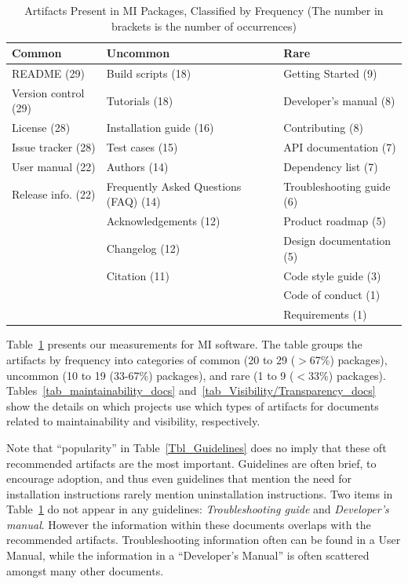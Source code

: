 \documentclass[final, 12pt, 3p, times]{elsarticle}
\begin{document}
\begin{table}[ht!]
    \begin{tabular}{ p{3.1 cm} p{5.4 cm} p{3.5 cm}}
    \toprule
    Common & Uncommon & Rare \\
    \midrule
    README (29) & Build scripts (18) & Getting Started (9)\\
    Version control (29) & Tutorials (18) & Developer's manual (8)\\
    License (28) & Installation guide (16) & Contributing (8)\\
    Issue tracker (28) & Test cases (15) & API documentation (7)\\
    User manual (22) & Authors (14) & Dependency list (7)\\
    Release info. (22) & Frequently Asked Questions (FAQ) (14) & Troubleshooting guide (6)\\
     & Acknowledgements (12) & Product roadmap (5)\\
     & Changelog (12) & Design documentation (5)\\
     & Citation (11) & Code style guide (3)\\
     & & Code of conduct (1)\\
     & & Requirements (1)\\
    \bottomrule
    \end{tabular}
    \caption{Artifacts Present in MI Packages, Classified by Frequency (The number 
    in brackets is the number of occurrences)}
    \label{artifactspresent}
\end{table}

Table~\ref{artifactspresent} presents our measurements for MI software.
The table groups the artifacts by frequency
into categories of common (20 to 29 ($>$67\%) packages), uncommon (10 to 19
(33-67\%) packages), and rare (1 to 9 ($<$33\%) packages).
Tables~\ref{tab_maintainability_docs} and~\ref{tab_Visibility/Transparency_docs}
show the details on which projects use which types of artifacts for documents
related to maintainability and visibility, respectively.

Note that ``popularity'' in Table~\ref{Tbl_Guidelines} does no imply that these
oft recommended artifacts are the most important. Guidelines are often brief,
to encourage adoption, and thus even guidelines that mention the need for
installation instructions rarely mention uninstallation instructions.
Two items in Table~\ref{artifactspresent} do not appear in any guidelines:
\emph{Troubleshooting guide} and \emph{Developer's manual}.  However the
information within these documents overlaps with
the recommended artifacts.  Troubleshooting information often can be found in
a User Manual, while the information in a ``Developer's Manual'' is often
scattered amongst many other documents.
\end{document}
